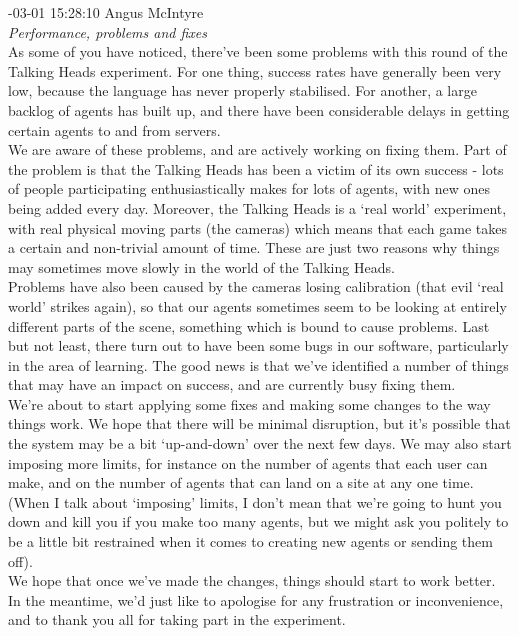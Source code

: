 \begin{mail}
{-03-01 15:28:10 Angus McIntyre}\\
{\itshape Performance, problems and fixes}\\
As some of you have noticed, there've been some problems with this round of the Talking Heads experiment. For one thing, success rates have generally been very low, because the language has never properly stabilised. For another, a large backlog of agents has built up, and there have been considerable delays in getting certain agents to and from servers.\\
We are aware of these problems, and are actively working on fixing them. Part of the problem is that the Talking Heads has been a victim of its own success - lots of people participating enthusiastically makes for lots of agents, with new ones being added every day. Moreover, the Talking Heads is a `real world' experiment, with real physical moving parts (the cameras) which means that each game takes a certain and non-trivial amount of time. These are just two reasons why things may sometimes move slowly in the world of the Talking Heads.\\
Problems have also been caused by the cameras losing calibration (that evil `real world' strikes again), so that our agents sometimes seem to be looking at entirely different parts of the scene, something which is bound to cause problems. Last but not least, there turn out to have been some bugs in our software, particularly in the area of learning. The good news is that we've identified a number of things that may have an impact on success, and are currently busy fixing them.\\
We're about to start applying some fixes and making some changes to the way things work. We hope that there will be minimal disruption, but it's possible that the system may be a bit `up-and-down' over the next few days. We may also start imposing more limits, for instance on the number of agents that each user can make, and on the number of agents that can land on a site at any one time. (When I talk about `imposing' limits, I don't mean that we're going to hunt you down and kill you if you make too many agents, but we might ask you politely to be a little bit restrained when it comes to creating new agents or sending them off). \\
We hope that once we've made the changes, things should start to work better. In the meantime, we'd just like to apologise for any frustration or inconvenience, and to thank you all for taking part in the experiment. \\

\end{mail}

